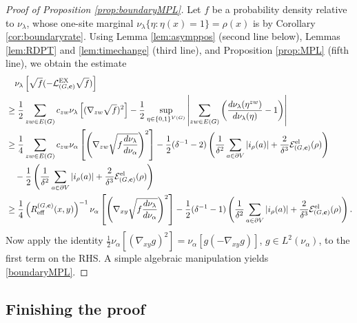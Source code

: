 \documentclass[11pt]{amsart}
\theoremstyle{plain}
\theoremstyle{definition}
\theoremstyle{remark}
\newtheorem{remark}[lemma]{Remark}
\begin{document}
\begin{proof}[Proof of Proposition \ref{prop:boundaryMPL}]
Let $f$ be a probability density relative to $\nu_\lambda$, whose one-site marginal $\nu_\lambda\{\eta: \eta(x)=1\}=\rho(x)$ is by Corollary \ref{cor:boundaryrate}.
Using Lemma \ref{lem:asymppos} (second line below), Lemmas  \ref{lem:RDPT} and \ref{lem:timechange} (third line), and Proposition \ref{prop:MPL} (fifth line), we obtain the estimate
\begin{align*}
& \quad \nu_\lambda\left[\sqrt f(-\mathcal{L}^{\rm EX}_{(G,{\bf c})} \sqrt f)\right] \\ 
\nonumber &\geq \frac{1}{2} \sum_{zw\in E(G)} c_{zw} \nu_\lambda\left[(\nabla_{zw} \sqrt{f})^2\right] - \frac{1}{2} \sup_{\eta\in \{0,1\}^{V(G)}}\left|\sum_{zw\in E(G)} \left(\frac{d\nu_\lambda(\eta^{zw})}{d\nu_\lambda (\eta)}-1\right)\right|\\
& \nonumber \geq \frac{1}{4} \sum_{zw\in E(G)} c_{zw} \nu_\alpha\left[\left(\nabla_{zw}\sqrt{f\frac{d\nu_\lambda}{d\nu_\alpha}}\right)^2\right] - \frac{1}{2} (\delta^{-1}-2)\left(\frac{1}{\delta^2} \sum_{a\in \partial V} |i_\rho(a)| + \frac{2}{\delta^3} \mathcal{E}^{\rm el}_{(G,{\bf c})} (\rho) \right) \\
& \nonumber \quad - \frac{1}{2}\left(\frac{1}{\delta^2} \sum_{a\in \partial V} |i_\rho(a)| + \frac{2}{\delta^3} \mathcal{E}^{\rm el}_{(G,{\bf c})} (\rho) \right) \\
& \nonumber \geq \frac{1}{4} \left(R_{\rm eff}^{(G,{\bf c})}(x,y)\right)^{-1} \nu_\alpha\left[\left(\nabla_{xy} \sqrt{f\frac{d\nu_\lambda}{d\nu_\alpha}}\right)^2 \right] - \frac{1}{2}(\delta^{-1}-1)\left(\frac{1}{\delta^2} \sum_{a\in \partial V} |i_\rho(a)| + \frac{2}{\delta^3} \mathcal{E}^{\rm el}_{(G,{\bf c})} (\rho) \right).
\end{align*}
Now apply the identity $\frac{1}{2}\nu_\alpha\left[(\nabla_{xy} g)^2\right] = \nu_\alpha\left[g(-\nabla_{xy} g) \right]$, $g\in L^2(\nu_\alpha)$, to the first term on the RHS. A simple algebraic manipulation yields \eqref{boundaryMPL}.
\end{proof}

\subsection{Finishing the proof} \label{sec:localergodicboundary}

\end{document}
